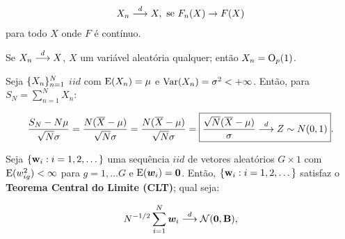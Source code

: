 \documentclass[11pt, oneside, a4paper, article]{article}
\numberwithin{equation}{section}
\begin{document}
\begin{description}
\begin{defn}
\vspace{-1 em}
\begin{align*}
	X_{n}  \overset{d}{\longrightarrow}  X, \text{ se } F_{n}(X) \to F(X)
\end{align*}
\noindent
para todo $X$ onde $F$ é contínuo.
\end{defn}

\begin{lem}
\citet[Lemma 3.5, p.39]{wool-2010}

Se $X_{n}  \overset{d}{\longrightarrow}  X$, $X$ um variável aleatória qualquer; então $X_{n} = \text{O}_{p}(1)$.
\end{lem}

\begin{defn} \label{def:tcl}

Seja $\{X_{n}\}_{n = 1}^{N}$ $iid$ com $\text{E}(X_{n}) = \mu$ e $\text{Var}(X_{n}) = \sigma^{2} < + \infty$.
Então, para $S_{N} = \sum_{n=1}^{N} X_{n}$:

\begin{align*}
\frac{S_{N} - N \mu }{ \sqrt{N} \sigma}
=
\frac{N ( \overline{X} - \mu ) }{ \sqrt{N} \sigma}
=
\frac{N ( \overline{X} - \mu ) }{ \sqrt{N} \sigma}
=
\boxed{
\frac{\sqrt{N} ( \overline{X} - \mu ) }{\sigma}
 \overset{d}{\longrightarrow}  Z \sim N(0,1)}.
\end{align*}
\end{defn}

\begin{teo} \label{def:tcl:vec}
\citet[Teo 3.2, p.40]{wool-2010}

Seja $\{\mathbf{w}_{i}:i=1,2,\dots\}$ uma sequência $iid$ de vetores aleatórios $G \times 1$ com
$\text{E}( w_{ig}^{2} ) < \infty$ para $g= 1, \dots G$ 
e
$\text{E}( \boldsymbol{w}_{i} ) = \boldsymbol{0}$.
Então, $\{\mathbf{w}_{i}:i=1,2,\dots\}$ satisfaz o \textbf{Teorema Central do Limite (CLT)}; 
qual seja:

\vspace{-1 em}
\begin{align*}
	N^{-1/2} \sum_{i=1}^{N} \boldsymbol{w}_{i}  \overset{d}{\longrightarrow}  \mathcal{N}(\boldsymbol{0}, \mathbf{B}),
\end{align*}


\end{teo}
\end{description}
\end{document}
